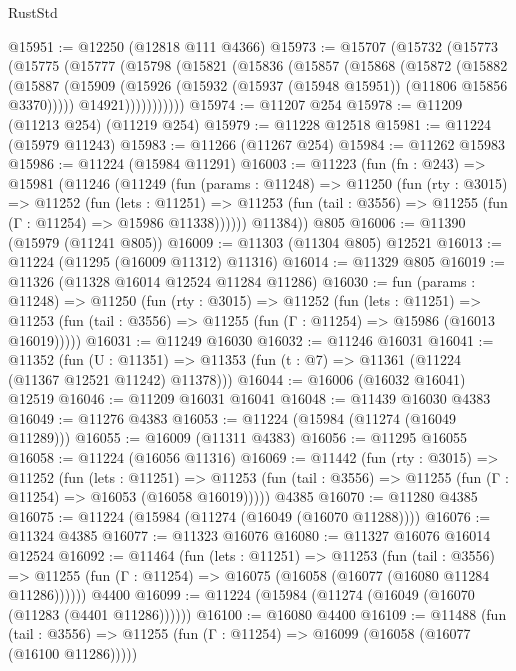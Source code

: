 \begin{lexlean}{RustStd}
\begin{coremodule}
@15951 := @12250 (@12818 @111 @4366)
@15973 := @15707
    (@15732
      (@15773
        (@15775
          (@15777
            (@15798
              (@15821
                (@15836
                  (@15857
                    (@15868
                      (@15872
                        (@15882
                          (@15887
                            (@15909
                              (@15926 (@15932 (@15937 (@15948 @15951)) (@11806 @15856 @3370)))))
                          @14921)))))))))))
@15974 := @11207 @254
@15978 := @11209 (@11213 @254) (@11219 @254)
@15979 := @11228 @12518
@15981 := @11224 (@15979 @11243)
@15983 := @11266 (@11267 @254)
@15984 := @11262 @15983
@15986 := @11224 (@15984 @11291)
@16003 := @11223
    (fun (fn : @243) =>
    @15981
      (@11246
        (@11249
          (fun (params : @11248) =>
          @11250
            (fun (rty : @3015) =>
            @11252
              (fun (lets : @11251) =>
              @11253 (fun (tail : @3556) => @11255 (fun (Γ : @11254) => @15986 @11338))))))
        @11384))
    @805
@16006 := @11390 (@15979 (@11241 @805))
@16009 := @11303 (@11304 @805) @12521
@16013 := @11224 (@11295 (@16009 @11312) @11316)
@16014 := @11329 @805
@16019 := @11326 (@11328 @16014 @12524 @11284 @11286)
@16030 := fun (params : @11248) =>
  @11250
    (fun (rty : @3015) =>
    @11252
      (fun (lets : @11251) =>
      @11253 (fun (tail : @3556) => @11255 (fun (Γ : @11254) => @15986 (@16013 @16019)))))
@16031 := @11249 @16030
@16032 := @11246 @16031
@16041 := @11352
    (fun (U : @11351) => @11353 (fun (t : @7) => @11361 (@11224 (@11367 @12521 @11242) @11378)))
@16044 := @16006 (@16032 @16041) @12519
@16046 := @11209 @16031 @16041
@16048 := @11439 @16030 @4383
@16049 := @11276 @4383
@16053 := @11224 (@15984 (@11274 (@16049 @11289)))
@16055 := @16009 (@11311 @4383)
@16056 := @11295 @16055
@16058 := @11224 (@16056 @11316)
@16069 := @11442
    (fun (rty : @3015) =>
    @11252
      (fun (lets : @11251) =>
      @11253 (fun (tail : @3556) => @11255 (fun (Γ : @11254) => @16053 (@16058 @16019)))))
    @4385
@16070 := @11280 @4385
@16075 := @11224 (@15984 (@11274 (@16049 (@16070 @11288))))
@16076 := @11324 @4385
@16077 := @11323 @16076
@16080 := @11327 @16076 @16014 @12524
@16092 := @11464
    (fun (lets : @11251) =>
    @11253
      (fun (tail : @3556) =>
      @11255 (fun (Γ : @11254) => @16075 (@16058 (@16077 (@16080 @11284 @11286))))))
    @4400
@16099 := @11224 (@15984 (@11274 (@16049 (@16070 (@11283 (@4401 @11286))))))
@16100 := @16080 @4400
@16109 := @11488
    (fun (tail : @3556) => @11255 (fun (Γ : @11254) => @16099 (@16058 (@16077 (@16100 @11286)))))

\end{coremodule}
\end{lexlean}
